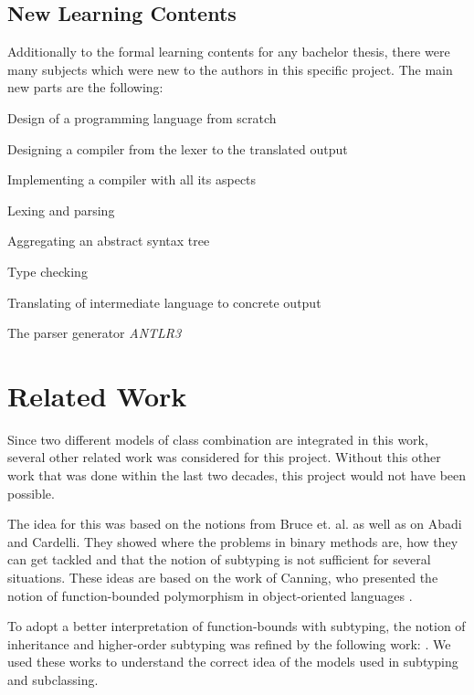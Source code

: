 \subsection{New Learning Contents}
Additionally to the formal learning contents for any bachelor thesis, there were many
subjects which were new to the authors in this specific project. The main new parts are the following:

\squishlist
	\item Design of a programming language from scratch
	\item Designing a compiler from the lexer to the translated output
	\item Implementing a compiler with all its aspects
	\squishlist
		\item Lexing and parsing
		\item Aggregating an abstract syntax tree
		\item Type checking
		\item Translating of intermediate language to concrete output
	\squishend
	\item The parser generator \emph{ANTLR3}
\squishend

\section{Related Work}
Since two different models of class combination are integrated in this
work, several other related work was considered for this project.
Without this other work that was done within the last two decades, this project would not
have been possible.

The idea for this was based on the notions from Bruce et. al. as
well as on Abadi and Cardelli.  They showed where the
problems in binary methods are, how they can get tackled
and that the notion of subtyping is not sufficient for several
situations\cite{bruce_binary_1995,abadi_subtyping_1996}. These ideas are
based on the work of Canning, who presented the notion of function-bounded
polymorphism in object-oriented languages \cite{canning_f-bounded_1989}.

To adopt a better interpretation of function-bounds
with subtyping, the notion of inheritance and
higher-order subtyping was refined by the following work:
\cite{steffen_higher-order_1994,cook_inheritance_1990,taivalsaari_notion_1996}.
We used these works to understand the correct idea of the models used
in subtyping and subclassing.

